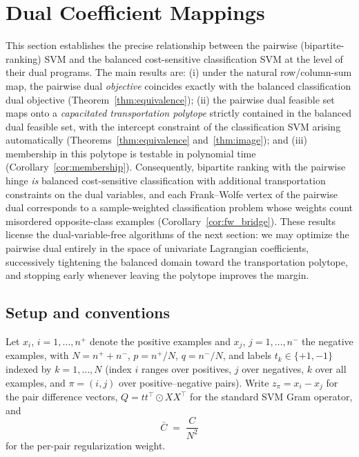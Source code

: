 \section{Dual Coefficient Mappings}
\label{sec:dual_maps}

This section establishes the precise relationship between the pairwise
(bipartite-ranking) SVM and the balanced cost-sensitive classification SVM at
the level of their dual programs. The main results are: (i) under the natural
row/column-sum map, the pairwise dual \emph{objective} coincides exactly with
the balanced classification dual objective (Theorem~\ref{thm:equivalence});
(ii) the pairwise dual feasible set maps onto a \emph{capacitated
transportation polytope} strictly contained in the balanced dual feasible set,
with the intercept constraint of the classification SVM arising automatically
(Theorems~\ref{thm:equivalence} and~\ref{thm:image}); and (iii) membership in
this polytope is testable in polynomial time
(Corollary~\ref{cor:membership}). Consequently, bipartite ranking with the
pairwise hinge \emph{is} balanced cost-sensitive classification with
additional transportation constraints on the dual variables, and each
Frank--Wolfe vertex of the pairwise dual corresponds to a sample-weighted
classification problem whose weights count misordered opposite-class examples
(Corollary~\ref{cor:fw_bridge}). These results license the dual-variable-free
algorithms of the next section: we may optimize the pairwise dual entirely in
the space of univariate Lagrangian coefficients, successively tightening the
balanced domain toward the transportation polytope, and stopping early
whenever leaving the polytope improves the margin.

\subsection{Setup and conventions}
\label{sec:conventions}

Let $x_i$, $i = 1, \dots, n^+$ denote the positive examples and $x_j$,
$j = 1, \dots, n^-$ the negative examples, with $N = n^+ + n^-$,
$p = n^+/N$, $q = n^-/N$, and labels $t_k \in \{+1, -1\}$ indexed by
$k = 1, \dots, N$ (index $i$ ranges over positives, $j$ over negatives, $k$
over all examples, and $\pi = (i,j)$ over positive--negative pairs). Write
$z_\pi = x_i - x_j$ for the pair difference vectors,
$Q = t t^\top \odot X X^\top$ for the standard SVM Gram operator, and
\begin{equation}
\bar{C} \;=\; \frac{C}{N^2}
\label{eq:cbar}
\end{equation}
for the per-pair regularization weight.

